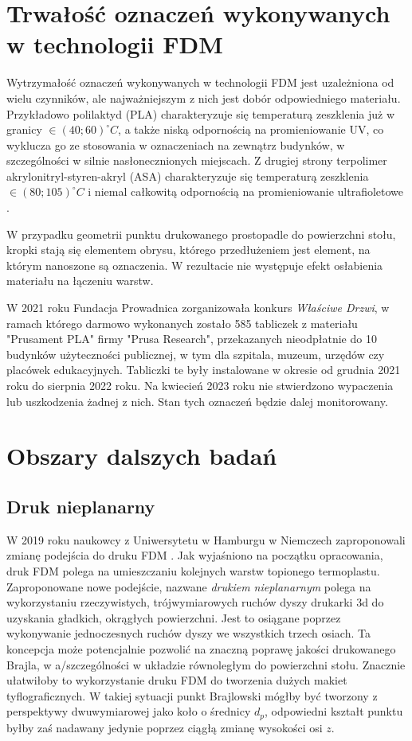 \documentclass[12pt,a4paper]{article}
\begin{document}
\section{Trwałość oznaczeń wykonywanych w technologii FDM}
Wytrzymałość oznaczeń wykonywanych w technologii FDM jest uzależniona od wielu czynników, ale najważniejszym z nich jest dobór odpowiedniego materiału.
Przykładowo polilaktyd (PLA) charakteryzuje się temperaturą zeszklenia już w granicy $\in (40; 60)^{\circ} C$, a także niską odpornością na promieniowanie UV, co wyklucza go ze stosowania w oznaczeniach na zewnątrz budynków, w szczególności w silnie nasłonecznionych miejscach. Z drugiej strony terpolimer akrylonitryl-styren-akryl (ASA) charakteryzuje się temperaturą zeszklenia $\in (80; 105)^{\circ} C$ i niemal całkowitą odpornością na promieniowanie ultrafioletowe \cite{plaabsasa}.

W przypadku geometrii punktu drukowanego prostopadle do powierzchni stołu, kropki stają się elementem obrysu, którego przedłużeniem jest element, na którym nanoszone są oznaczenia. W rezultacie nie występuje efekt osłabienia materiału na łączeniu warstw.

W 2021 roku Fundacja Prowadnica zorganizowała konkurs \emph{Właściwe Drzwi}, w ramach którego darmowo wykonanych zostało 585 tabliczek z materiału "Prusament PLA" firmy "Prusa Research", przekazanych nieodpłatnie do 10 budynków użyteczności publicznej, w tym dla szpitala, muzeum, urzędów czy placówek edukacyjnych. Tabliczki te były instalowane w okresie od grudnia 2021 roku do sierpnia 2022 roku. Na kwiecień 2023 roku nie stwierdzono wypaczenia lub uszkodzenia żadnej z nich. Stan tych oznaczeń będzie dalej monitorowany.

\section{Obszary dalszych badań}
\subsection{Druk nieplanarny}
W 2019 roku naukowcy z Uniwersytetu w Hamburgu w Niemczech zaproponowali zmianę podejścia do druku FDM \cite{nonplanar}. Jak wyjaśniono na początku opracowania, druk FDM polega na umieszczaniu kolejnych warstw topionego termoplastu. Zaproponowane nowe podejście, nazwane \emph{drukiem nieplanarnym} polega na wykorzystaniu rzeczywistych, trójwymiarowych ruchów dyszy drukarki 3d do uzyskania gładkich, okrągłych powierzchni. Jest to osiągane poprzez wykonywanie jednoczesnych ruchów dyszy we wszystkich trzech osiach.
Ta koncepcja może potencjalnie pozwolić na znaczną poprawę jakości drukowanego Brajla, w a/szczególności w układzie równoległym do powierzchni stołu. Znacznie ułatwiłoby to wykorzystanie druku FDM do tworzenia dużych makiet tyflograficznych.
W takiej sytuacji punkt Brajlowski mógłby być tworzony z perspektywy dwuwymiarowej jako koło o średnicy $d_p$, odpowiedni kształt punktu byłby zaś nadawany jedynie poprzez ciągłą zmianę wysokości osi $z$.
\end{document}
